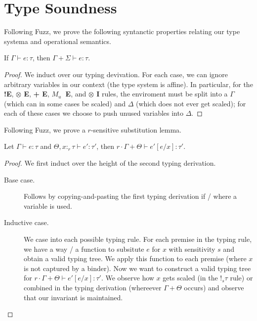 \section{Type Soundness}
Following Fuzz, we prove the following syntanctic properties relating our type
systema and operational semantics.

\begin{lemma}[Weakening]\label{thm:weakening}
  If $\Gamma \vdash e : \tau$, then $\Gamma + \Sigma \vdash e : \tau$.
\end{lemma}
\begin{proof}
  We induct over our typing devivation. 
  For each case, we can ignore arbitrary variables in our context (the type system is
  affine). 
  In particular, for the \textbf{!E}, \textbf{$\otimes$ E}, \textbf{+ E},
  \textbf{$M_u$~E}, and \textbf{$\otimes$ I} rules, the enviroment must be split
  into a $\Gamma$ (which can in some cases be scaled) and $\Delta$ (which does
  not ever get scaled); for each of these cases we choose to push unused
  variables into $\Delta$. 
\end{proof}

Following Fuzz, we prove a $r$-sensitive substitution lemma.
\begin{lemma}\label{thm:substitution}
  Let $\Gamma \vdash e : \tau$ and $\Theta, x :_r \tau \vdash e' : \tau'$, then 
  $r \cdot \Gamma + \Theta \vdash e'[e/x] : \tau'$.
\end{lemma}
\begin{proof}
  We first induct over the height of the second typing derivation. 
  \begin{description}
    \item[Base case.] Follows by copying-and-pasting the first typing derivation
      if / where a variable is used.
    \item[Inductive case.] We case into each possible typing rule. 
      For each premise in the typing rule, we have a way / a function to
      subsitute $e$ for $x$ with sensitivity $s$ and obtain a valid typing tree. 
      We apply this function to each premise (where $x$ is not captured by a
      binder). 
      Now we want to construct a valid typing tree for $r \cdot \Gamma + \Theta
      \vdash e'[e/x] : \tau'$. We observe how $x$ gets scaled (in the $!_s \tau$
      rule) or combined in the typing derivation (whereever $\Gamma + \Theta$
      occurs) and observe that our invariant is maintained.
  \end{description}
\end{proof}

